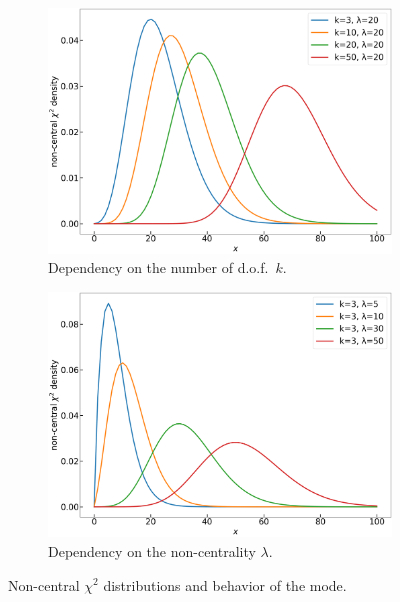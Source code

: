 \documentclass[final,5p,twocolumn,preprint,nopreprintline,times,authoryear]{elsarticle}
\begin{document}
\begin{figure}[h]
	\centering
	\begin{subfigure}[t]{0.22\textwidth}
		\centering
		\includegraphics[width=\linewidth]{ncx2-of-df.png}
		\caption{Dependency on the number of d.o.f.~$k$.}\label{fig:ncx2-curves-df}
	\end{subfigure}
	\quad
	\begin{subfigure}[t]{0.22\textwidth}
		\centering
		\includegraphics[width=\linewidth]{ncx2-of-lambda.png}
		\caption{Dependency on the non-centrality $\lambda$.}\label{fig:ncx2-curves-lambda}
	\end{subfigure}
	\caption{Non-central $\chi^2$ distributions and behavior of the mode.}\label{fig:ncx2-curves}
\end{figure}
\end{document}
